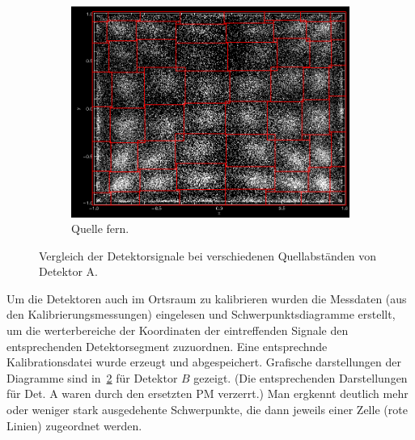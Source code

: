 \documentclass[slug=PET, room=Andreas-Schubert-Bau\,\ 424A, supervisor=Carsten\ Bittrich, coursedate=10.\ 01.\ 2020]{../../Lab_Report_LaTeX/lab_report}
\begin{document}
\begin{figure}[h!]
\begin{subfigure}{0.32\textwidth}
    \includegraphics[width=.9\textwidth]{../messungen/kalib/vergleich_mitte_fern_FERN.png}
    \caption{Quelle fern.}
    \label{fig:ab-fern}
  \end{subfigure}
  \caption{Vergleich der Detektorsignale bei verschiedenen
    Quellabständen von Detektor A.}
  \label{fig:abstand}
\end{figure}

Um die Detektoren auch im Ortsraum zu kalibrieren wurden die Messdaten
(aus den Kalibrierungsmessungen) eingelesen und Schwerpunktsdiagramme
erstellt, um die werterbereiche der Koordinaten der eintreffenden
Signale den entsprechenden Detektorsegment zuzuordnen. Eine
entsprechnde Kalibrationsdatei wurde erzeugt und
abgespeichert. Grafische darstellungen der Diagramme sind
in~\ref{fig:abstand} f\"ur Detektor \(B\) gezeigt. (Die entsprechenden
Darstellungen f\"ur Det. A waren durch den ersetzten PM verzerrt.)
Man ergkennt deutlich mehr oder weniger stark ausgedehente
Schwerpunkte, die dann jeweils einer Zelle (rote Linien) zugeordnet
werden.
\end{document}
